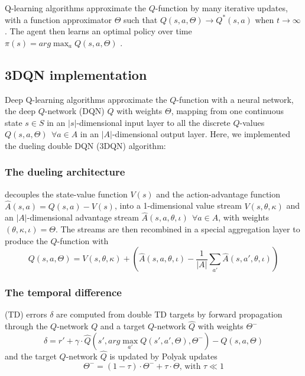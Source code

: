 \documentclass[journal]{IEEEtran}
\begin{document}
Q-learning algorithms approximate the $Q$-function by many iterative updates, with a function approximator $\Theta$ such that $Q(s,a,\Theta) \rightarrow Q^*(s,a)$ when $t \rightarrow \infty$. The agent then learns an optimal policy over time $\pi(s) = arg \max_a Q(s,a,\Theta)$ \cite{sutton2018reinforcement}.

\subsection{3DQN implementation}

Deep Q-learning algorithms approximate the $Q$-function with a neural network, the deep $Q$-network (DQN) \cite{hessel2017rainbow,mnih2013playing,mnih2015human} $Q$ with weights $\Theta$, mapping from one continuous state $s \in S$ in an $|s|$-dimensional input layer to all the discrete $Q$-values $Q(s,a,\Theta) \:\: \forall a \in A$ in an $|A|$-dimensional output layer. Here, we implemented the dueling double DQN (3DQN) algorithm: \\

\subsubsection{The dueling architecture} \cite{wang2016dueling} decouples the state-value function $V(s)$ and the action-advantage function $\widehat{A}(s,a) = Q(s,a) - V(s)$, into a 1-dimensional value stream $V(s,\theta,\kappa)$ and an $|A|$-dimensional advantage stream $\widehat{A}(s,a,\theta,\iota) \:\: \forall a \in A$, with weights $(\theta,\kappa,\iota) = \Theta$. The streams are then recombined in a special aggregation layer to produce the $Q$-function with
\[ Q(s,a,\Theta) = V(s,\theta,\kappa) + (\widehat{A}(s,a,\theta,\iota) - \frac{1}{|A|}\sum_{a'} \widehat{A}(s,a',\theta,\iota) ) \]

\subsubsection{The temporal difference} (TD) errors $\delta$ are computed from double TD targets \cite{hasselt2015deep} by forward propagation through the $Q$-network $Q$ and a target $Q$-network $\widehat{Q}$ with weights $\Theta^-$
\[ \delta = r' + \gamma \cdot \widehat{Q}(s', arg \max_{a'} Q(s',a',\Theta), \Theta^-) - Q(s,a,\Theta)\]
and the target $Q$-network $\widehat{Q}$ is updated by Polyak updates \cite{lillicrap2019continuous}
\[ \Theta^- = (1 - \tau) \cdot \Theta^- + \tau \cdot \Theta \text{, with } \tau \ll 1\]
\end{document}
